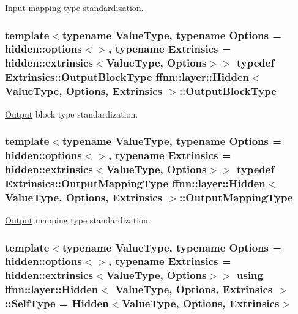 Input mapping type standardization. 

\hypertarget{classffnn_1_1layer_1_1_hidden_a9fd326932b57e1d86d86bdb168822727}{
\subsubsection[{Output\-Block\-Type}]{\setlength{\rightskip}{0pt plus 5cm}template$<$typename Value\-Type, typename Options = hidden\-::options$<$$>$, typename Extrinsics = hidden\-::extrinsics$<$\-Value\-Type, Options$>$$>$ typedef Extrinsics\-::\-Output\-Block\-Type {\bf ffnn\-::layer\-::\-Hidden}$<$ Value\-Type, Options, Extrinsics $>$\-::{\bf Output\-Block\-Type}}}\label{classffnn_1_1layer_1_1_hidden_a9fd326932b57e1d86d86bdb168822727}


\hyperlink{classffnn_1_1layer_1_1_output}{Output} block type standardization. 

\hypertarget{classffnn_1_1layer_1_1_hidden_a9d882e035c7cd80ccd9b58fbe832591e}{
\subsubsection[{Output\-Mapping\-Type}]{\setlength{\rightskip}{0pt plus 5cm}template$<$typename Value\-Type, typename Options = hidden\-::options$<$$>$, typename Extrinsics = hidden\-::extrinsics$<$\-Value\-Type, Options$>$$>$ typedef Extrinsics\-::\-Output\-Mapping\-Type {\bf ffnn\-::layer\-::\-Hidden}$<$ Value\-Type, Options, Extrinsics $>$\-::{\bf Output\-Mapping\-Type}}}\label{classffnn_1_1layer_1_1_hidden_a9d882e035c7cd80ccd9b58fbe832591e}


\hyperlink{classffnn_1_1layer_1_1_output}{Output} mapping type standardization. 

\hypertarget{classffnn_1_1layer_1_1_hidden_a27c65759b388a6312329cf610d4fa4a3}{
\subsubsection[{Self\-Type}]{\setlength{\rightskip}{0pt plus 5cm}template$<$typename Value\-Type, typename Options = hidden\-::options$<$$>$, typename Extrinsics = hidden\-::extrinsics$<$\-Value\-Type, Options$>$$>$ using {\bf ffnn\-::layer\-::\-Hidden}$<$ Value\-Type, Options, Extrinsics $>$\-::{\bf Self\-Type} =  {\bf Hidden}$<$Value\-Type, Options, Extrinsics$>$}}\label{classffnn_1_1layer_1_1_hidden_a27c65759b388a6312329cf610d4fa4a3}


